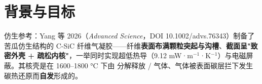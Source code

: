 
\section{背景与目标}

仿生参考：Yang 等 2026（\textit{Advanced Science}，DOI 10.1002/advs.76343）制备了苦瓜仿生结构的 C-SiC 纤维气凝胶——纤维\textbf{表面布满颗粒突起与沟槽}、\textbf{截面呈"致密外壳 + 疏松内核"}，一举同时实现超低热导（9.12 mW·m$^{-1}$·K$^{-1}$）与电磁屏蔽。其核壳是在 1600–1800 °C 下由  分解释放 / 气体、气体被表面碳层拦下发生碳热还原而\textbf{自发}形成的。

